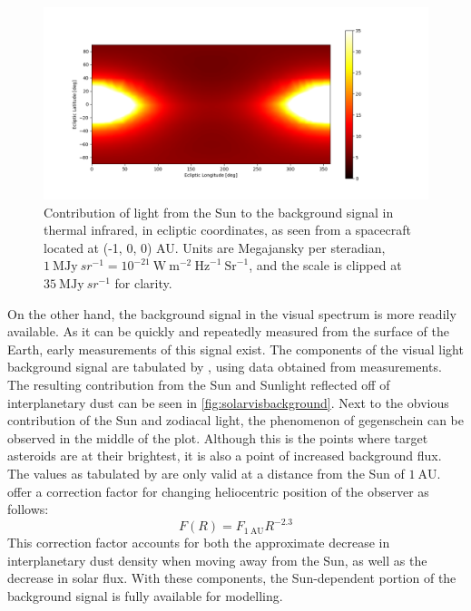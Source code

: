 \begin{figure}[htbp]
 \centering
 \includegraphics[width=1.0\textwidth]{img/background_tir_zodiac.png}
 \caption{Contribution of light from the Sun to the background signal in thermal infrared, in ecliptic coordinates, as seen from a spacecraft located at (-1, 0, 0) AU. Units are Megajansky per steradian, $1 ~\mathrm{MJy}~{sr}^{-1} = 10^{-21} ~\mathrm{W}~\mathrm{m}^{-2}~\mathrm{Hz}^{-1}~\mathrm{Sr}^{-1}$, and the scale is clipped at $35 ~\mathrm{MJy}~{sr}^{-1}$ for clarity.}
 \label{fig:solartirbackground}
\end{figure}

On the other hand, the background signal in the visual spectrum is more readily available. As it can be quickly and repeatedly measured from the surface of the Earth, early measurements of this signal exist. The components of the visual light background signal are tabulated by \cite{LightOfTheNightSky}, using data obtained from measurements. The resulting contribution from the Sun and Sunlight reflected off of interplanetary dust can be seen in \autoref{fig:solarvisbackground}. Next to the obvious contribution of the Sun and zodiacal light, the phenomenon of gegenschein can be observed in the middle of the plot. Although this is the points where target asteroids are at their brightest, it is also a point of increased background flux. The values as tabulated by \cite{LightOfTheNightSky} are only valid at a distance from the Sun of $1~\mathrm{AU}$. \cite{SkyBrightness} offer a correction factor for changing heliocentric position of the observer as follows:
\begin{equation}
 F(R) = F_{1~\mathrm{AU}}R^{-2.3}
 \label{eq:sunscale}
\end{equation}
This correction factor accounts for both the approximate decrease in interplanetary dust density when moving away from the Sun, as well as the decrease in solar flux. With these components, the Sun-dependent portion of the background signal is fully available for modelling. \\

